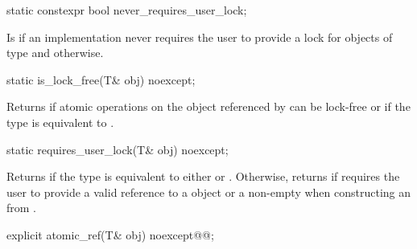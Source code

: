 \begin{addedblock}
\begin{itemdecl}
static constexpr bool never_requires_user_lock;
\end{itemdecl}

\begin{itemdescr}
\pnum
Is  if an implementation never requires the user to provide a 
lock for objects of type  and  otherwise.
\end{itemdescr}


\begin{itemdecl}
static is_lock_free(T& obj) noexcept;
\end{itemdecl}

\begin{itemdescr}
\returns Returns  if atomic operations on the object referenced by
 can be lock-free or if the  type is equivalent to 
.
\end{itemdescr}


\begin{itemdecl}
static requires_user_lock(T& obj) noexcept;
\end{itemdecl}

\begin{itemdescr}
\returns Returns  if the type  is equivalent to either
 or .
Otherwise, returns  if  requires the user to
provide a valid reference to a  object 
or a non-empty  
when constructing an  from . 
\end{itemdescr}
\end{addedblock}


\begin{itemdecl}
explicit atomic_ref(T& obj) noexcept@\added{(\seebelow)}@;
\end{itemdecl}

